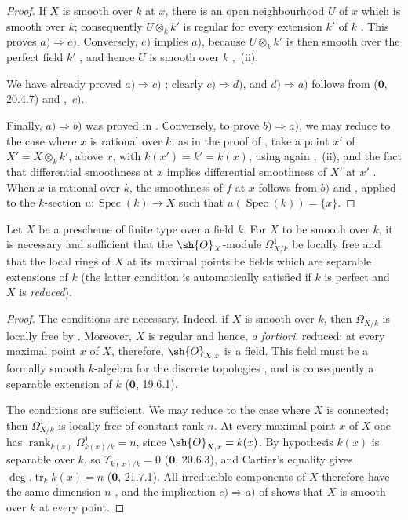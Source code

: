 \begin{proof}
If $X$ is smooth over $k$ at $x$, there is an open neighbourhood $U$ of $x$ which is smooth over $k$; consequently $U\otimes_k k'$ is regular for every extension $k'$ of $k$ .  This proves $a)\Rightarrow e)$.  Conversely, $e)$ implies $a)$, because $U\otimes_k k'$ is then smooth over the perfect field $k'$ , and hence $U$ is smooth over $k$ ,~(ii).

We have already proved $a)\Rightarrow c)$ ; clearly $c)\Rightarrow d)$, and $d)\Rightarrow a)$ follows from ($\mathbf{0}$, 20.4.7) and ,~$c)$.

Finally, $a)\Rightarrow b)$ was proved in .  Conversely, to prove $b)\Rightarrow a)$, we may reduce to the case where $x$ is rational over $k$: as in the proof of , take a point $x'$ of $X'=X\otimes_k k'$, above $x$, with $k(x')=k'=k(x)$, using again ,~(ii), and the fact that differential smoothness at $x$ implies differential smoothness of $X'$ at $x'$ .  When $x$ is rational over $k$, the smoothness of $f$ at $x$ follows from $b)$ and , applied to the $k$-section $u:\operatorname{Spec}(k)\to X$ such that $u(\operatorname{Spec}(k))=\{x\}$.
\end{proof}

\begin{corollary}[17.15.6]
\label{IV.17.15.6}
Let $X$ be a prescheme of finite type over a field $k$.
For $X$ to be smooth over $k$, it is necessary and sufficient that the $\sh{O}_X$-module $\Omega^1_{X/k}$ be locally free and that the local rings of $X$ at its maximal points be fields which are separable extensions of $k$ (the latter condition is automatically satisfied if $k$ is perfect and $X$ is \emph{reduced}).
\end{corollary}

\begin{proof}
The conditions are necessary.  Indeed, if $X$ is smooth over $k$, then $\Omega^1_{X/k}$ is locally free by .  Moreover, $X$ is regular and hence, \emph{a fortiori}, reduced; at every maximal point $x$ of $X$, therefore, $\sh{O}_{X,x}$ is a field.  This field must be a formally smooth $k$-algebra for the discrete topologies , and is consequently a separable extension of $k$ ($\mathbf{0}$, 19.6.1).

The conditions are sufficient.
We may reduce to the case where $X$ is connected; then $\Omega^1_{X/k}$ is locally free of constant rank $n$.  At every maximal point $x$ of $X$ one has
$\operatorname{rank}_{k(x)}\Omega^1_{k(x)/k}=n$, since $\sh{O}_{X,x}=k(x)$.  By hypothesis $k(x)$ is separable over $k$, so $\Upsilon_{k(x)/k}=0$ ($\mathbf{0}$, 20.6.3), and Cartier's equality gives $\deg.\operatorname{tr}_k k(x)=n$ ($\mathbf{0}$, 21.7.1).  All irreducible components of $X$ therefore have the same dimension $n$ , and the implication $c)\Rightarrow a)$ of  shows that $X$ is smooth over $k$ at every point.
\end{proof}

